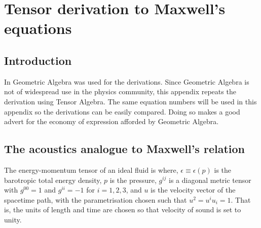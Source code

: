 

\chapter{Tensor derivation to Maxwell's equations}\label{ch:acousticSRTensor}


\section{Introduction}\label{sec:AcousticSRTensor:introduction}

In  Geometric Algebra was used for the derivations.
Since Geometric Algebra is not of widespread use in the physics community, this appendix repeats the derivation using Tensor Algebra.
The same equation numbers will be used in this appendix so the derivations can be easily compared.
Doing so makes a good advert for the economy of expression afforded by Geometric Algebra.

\section{The acoustics analogue to Maxwell's relation}

The energy-momentum tensor of an ideal fluid is\cite{LandauBook, Taub1978}
where, $\epsilon \equiv \epsilon(p)$ is the barotropic total energy density,
$p$ is the pressure,
$g^{i j}$ is a diagonal metric tensor with $g^{00}=1$ and $g^{i i} = -1$ for $i=1,2,3$,
and 
$u$ is the velocity vector of the spacetime path, with the parametrisation chosen such that $u^2 = u^i u_i = 1$. %
That is, the units of length and time are chosen so that velocity of sound is set to unity.

